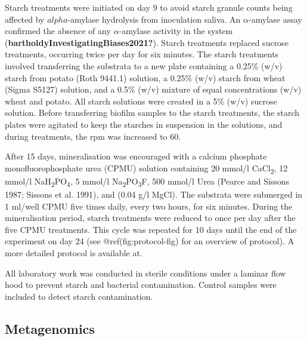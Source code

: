 \documentclass[
]{article}
\begin{document}
Starch treatments were initiated on day 9 to avoid starch granule counts
being affected by \(alpha\)-amylase hydrolysis from inoculation saliva.
An \(\alpha\)-amylase assay confirmed the absence of any
\(\alpha\)-amylase activity in the system
(\textbf{bartholdyInvestigatingBiases2021?}). Starch treatments replaced
sucrose treatments, occurring twice per day for six minutes. The starch
treatments involved transferring the substrata to a new plate containing
a 0.25\% (w/v) starch from potato (Roth 9441.1) solution, a 0.25\% (w/v)
starch from wheat (Sigma S5127) solution, and a 0.5\% (w/v) mixture of
equal concentrations (w/v) wheat and potato. All starch solutions were
created in a 5\% (w/v) sucrose solution. Before transferring biofilm
samples to the starch treatments, the starch plates were agitated to
keep the starches in suspension in the solutions, and during treatments,
the rpm was increased to 60.

After 15 days, mineralisation was encouraged with a calcium phosphate
monofluorophosphate urea (CPMU) solution containing 20 mmol/l
CaCl\textsubscript{2}, 12 mmol/l
NaH\textsubscript{2}PO\textsubscript{4}, 5 mmol/l
Na\textsubscript{2}PO\textsubscript{3}F, 500 mmol/l Urea (Pearce and
Sissons 1987; Sissons et al. 1991), and (0.04 g/l MgCl). The substrata
were submerged in 1 ml/well CPMU five times daily, every two hours, for
six minutes. During the mineralisation period, starch treatments were
reduced to once per day after the five CPMU treatments. This cycle was
repeated for 10 days until the end of the experiment on day 24 (see
@ref(fig:protocol-fig) for an overview of protocol). A more detailed
protocol is available at.

All laboratory work was conducted in sterile conditions under a laminar
flow hood to prevent starch and bacterial contamination. Control samples
were included to detect starch contamination.

\hypertarget{metagenomics}{%
\subsection{Metagenomics}\label{metagenomics}}
\end{document}
